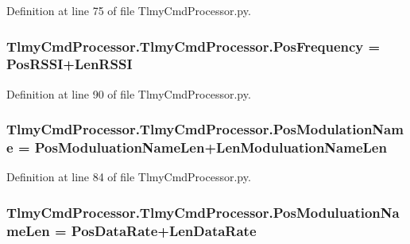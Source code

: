 Definition at line 75 of file Tlmy\+Cmd\+Processor.\+py.

\hypertarget{namespace_tlmy_cmd_processor_1_1_tlmy_cmd_processor_aff115557ac981e9e7b5d05fc450de80b}{}
\subsubsection[{Pos\+Frequency}]{\setlength{\rightskip}{0pt plus 5cm}Tlmy\+Cmd\+Processor.\+Tlmy\+Cmd\+Processor.\+Pos\+Frequency = {\bf Pos\+R\+S\+S\+I}+{\bf Len\+R\+S\+S\+I}}\label{namespace_tlmy_cmd_processor_1_1_tlmy_cmd_processor_aff115557ac981e9e7b5d05fc450de80b}


Definition at line 90 of file Tlmy\+Cmd\+Processor.\+py.

\hypertarget{namespace_tlmy_cmd_processor_1_1_tlmy_cmd_processor_ac1137c905bca1594a8a5691668001c00}{}
\subsubsection[{Pos\+Modulation\+Name}]{\setlength{\rightskip}{0pt plus 5cm}Tlmy\+Cmd\+Processor.\+Tlmy\+Cmd\+Processor.\+Pos\+Modulation\+Name = {\bf Pos\+Moduluation\+Name\+Len}+{\bf Len\+Moduluation\+Name\+Len}}\label{namespace_tlmy_cmd_processor_1_1_tlmy_cmd_processor_ac1137c905bca1594a8a5691668001c00}


Definition at line 84 of file Tlmy\+Cmd\+Processor.\+py.

\hypertarget{namespace_tlmy_cmd_processor_1_1_tlmy_cmd_processor_a842d2ed3cb03a36110727a626772cd3c}{}
\subsubsection[{Pos\+Moduluation\+Name\+Len}]{\setlength{\rightskip}{0pt plus 5cm}Tlmy\+Cmd\+Processor.\+Tlmy\+Cmd\+Processor.\+Pos\+Moduluation\+Name\+Len = {\bf Pos\+Data\+Rate}+{\bf Len\+Data\+Rate}}\label{namespace_tlmy_cmd_processor_1_1_tlmy_cmd_processor_a842d2ed3cb03a36110727a626772cd3c}


